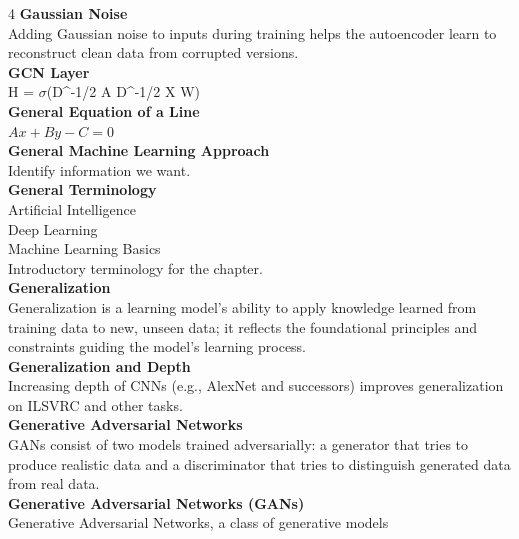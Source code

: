 \documentclass[8pt]{extarticle}
\begin{document}
\begin{multicols}{4}
\vspace{2pt}\textbf{Gaussian Noise}\\
Adding Gaussian noise to inputs during training helps the autoencoder learn to reconstruct clean data from corrupted versions.\\
\vspace{2pt}\textbf{GCN Layer}\\
H = $\sigma$(D\textasciicircum{}{-1/2} A D\textasciicircum{}{-1/2} X W)\\
\vspace{2pt}\textbf{General Equation of a Line}\\
$A x + B y - C = 0$\\
\vspace{2pt}\textbf{General Machine Learning Approach}\\
Identify information we want.\\
\vspace{2pt}\textbf{General Terminology}\\
Artificial Intelligence\\
Deep Learning\\
Machine Learning Basics\\
Introductory terminology for the chapter.\\
\vspace{2pt}\textbf{Generalization}\\
Generalization is a learning model's ability to apply knowledge learned from training data to new, unseen data; it reflects the foundational principles and constraints guiding the model's learning process.\\
\vspace{2pt}\textbf{Generalization and Depth}\\
Increasing depth of CNNs (e.g., AlexNet and successors) improves generalization on ILSVRC and other tasks.\\
\vspace{2pt}\textbf{Generative Adversarial Networks}\\
GANs consist of two models trained adversarially: a generator that tries to produce realistic data and a discriminator that tries to distinguish generated data from real data.\\
\vspace{2pt}\textbf{Generative Adversarial Networks (GANs)}\\
Generative Adversarial Networks, a class of generative models\\


\end{multicols}
\end{document}
